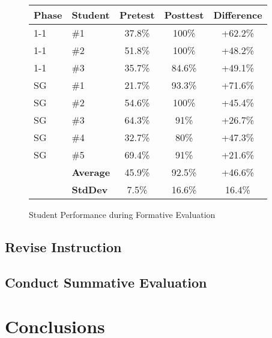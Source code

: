 \documentclass{sig-alternate}
\begin{document}
\begin{figure}
\begin{tabular}{l|l|c|c|c}
	Phase & Student & Pretest & Posttest & Difference\\\hline
	1-1 & \#1 & 37.8\% & 100\% & +62.2\%\\
	1-1 & \#2 & 51.8\% & 100\% & +48.2\%\\
	1-1 & \#3 & 35.7\% & 84.6\% & +49.1\%\\\hline
	SG & \#1 & 21.7\% & 93.3\% & +71.6\%\\
	SG & \#2 & 54.6\% & 100\% & +45.4\%\\
	SG & \#3 & 64.3\% & 91\% & +26.7\%\\
	SG & \#4 & 32.7\% & 80\% & +47.3\%\\
	SG & \#5 & 69.4\% & 91\% & +21.6\%\\\hline
	& \textbf{Average} & 45.9\% & 92.5\% & +46.6\%\\
	& \textbf{StdDev} & 7.5\% & 16.6\% & 16.4\%\\
\end{tabular}
\caption{Student Performance during Formative Evaluation}
\label{fe-results}
\end{figure}

\subsection{Revise Instruction}
\subsection{Conduct Summative Evaluation}

\section{Conclusions}




 
\end{document}
